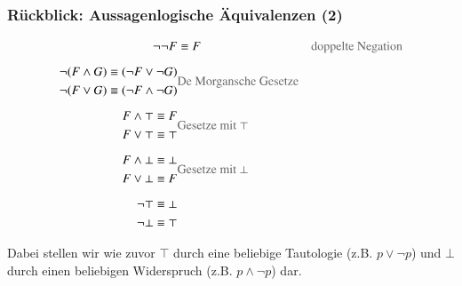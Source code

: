\documentclass[aspectratio=1610,onlymath]{beamer}
\begin{document}
\begin{frame}\frametitle{Rückblick: Aussagenlogische Äquivalenzen (2)}

\begin{align*}
\neg\neg F &\equiv F
		& \text{\textcolor{devilscss}{doppelte Negation}}\\[1ex]
%
\begin{split}
\neg(F\wedge G) & \equiv (\neg F\vee \neg G)\\
\neg(F\vee G) & \equiv (\neg F\wedge \neg G)
\end{split}
		& \text{\textcolor{devilscss}{De Morgansche Gesetze}} \\[1ex]
%
\begin{split}
F\wedge \top & \equiv F\\
F\vee \top & \equiv \top
\end{split}
		& \text{\textcolor{devilscss}{Gesetze mit $\top$}}\\[1ex]
%
\begin{split}
F\wedge \bot & \equiv \bot\\
F\vee \bot & \equiv F
\end{split}
		& \text{\textcolor{devilscss}{Gesetze mit $\bot$}}\\[1ex]
%
\begin{split}
\neg\top & \equiv \bot\\
\neg\bot & \equiv \top
\end{split}
		& 
\end{align*}

Dabei stellen wir wie zuvor $\top$ durch eine beliebige Tautologie (z.B. $p\vee\neg p$) und $\bot$ durch einen beliebigen Widerspruch (z.B. $p\wedge\neg p$) dar.

\end{frame}
\end{document}
